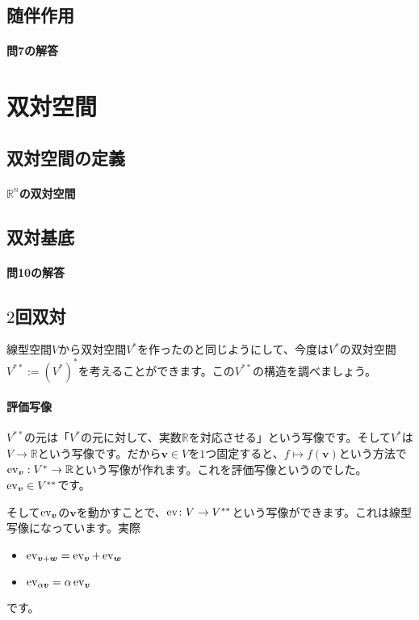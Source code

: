\subsection{随伴作用}

\paragraph{問7の解答}

\section{双対空間}

\subsection{双対空間の定義}

\paragraph{$\mathbb{R}^n$の双対空間}

\subsection{双対基底}

\paragraph{問10の解答}

\subsection{$2$回双対}

線型空間$V$から双対空間$V^*$を作ったのと同じようにして、今度は$V^*$の双対空間$V^{**} := (V^*)^*$を考えることができます。この$V^{**}$の構造を調べましょう。

\paragraph{評価写像} $V^{**}$の元は「$V^{*}$の元に対して、実数$\mathbb{R}$を対応させる」という写像です。そして$V^{*}$は$V\rightarrow\mathbb{R}$という写像です。だから$\bm{v} \in V$を$1$つ固定すると、$f\mapsto f(\bm{v})$という方法で$\operatorname{ev}_{\boldsymbol{v}}:V^{*}\rightarrow \mathbb{R}$という写像が作れます。これを評価写像というのでした。$\operatorname{ev}_{\boldsymbol{v}}\in V^{**}$です。

そして$\operatorname{ev}_{\boldsymbol{v}}$の$\bm{v}$を動かすことで、$\operatorname{ev}\colon V\rightarrow V^{**}$という写像ができます。これは線型写像になっています。実際
\begin{itemize}
\item $\operatorname{ev}_{\boldsymbol{v} + \boldsymbol{w}} = \operatorname{ev}_{\boldsymbol{v}} + \operatorname{ev}_{\boldsymbol{w}}$
\item $\operatorname{ev}_{\alpha\boldsymbol{v}} = \alpha \operatorname{ev}_{\boldsymbol{v}}$
\end{itemize}
です。

